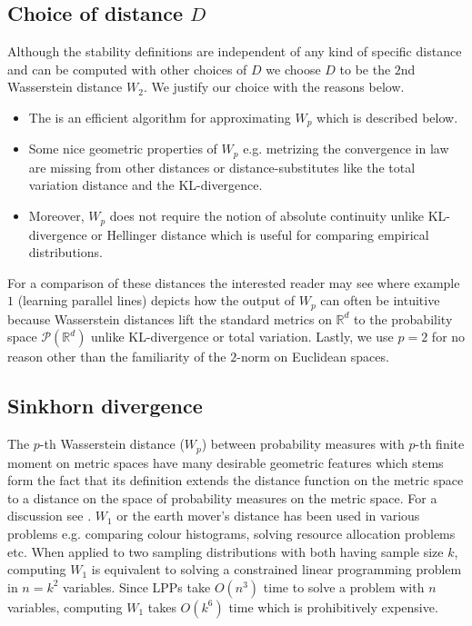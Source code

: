{\color{mypink}\subsection{Choice of distance $D$} Although the stability definitions are independent of  any kind of specific distance and can be computed with other choices of $D$ we choose $D$ to be the $2$nd Wasserstein distance $W_2$. We justify our choice with the reasons below.
\begin{itemize}
    \item The is an efficient algorithm for approximating $W_p$ which is described below. 
    \item Some nice geometric properties of $W_p$ e.g. metrizing the convergence in law \cite{feydy2019interpolating} are missing from other distances or distance-substitutes like the  total variation distance and  the KL-divergence. 
    \item Moreover, $W_p$ does not require the notion of absolute continuity unlike KL-divergence or Hellinger distance which is useful for comparing empirical distributions.
\end{itemize}
For a comparison of these distances the interested reader may see \cite{arjovsky2017wasserstein} where example $1$ (learning parallel lines) depicts how the output of $W_p$ can often be intuitive because Wasserstein distances lift the standard metrics on $\mathbb R^d$ to the probability space $\mathcal P(\mathbb R^d)$ unlike KL-divergence or total variation. Lastly, we use $p=2$ for no reason other than the familiarity of the $2$-norm on Euclidean spaces.}

\subsection{Sinkhorn divergence} \label{ssec-sink--probing-nfs}

The $p$-th Wasserstein distance ($W_p$) between probability measures with $p$-th finite moment on metric spaces have many desirable geometric features which stems form the fact that its definition extends the distance function on the metric space to a distance on the space of probability measures on the metric space. For a discussion see \cite{feydy2019interpolating, arjovsky2017wasserstein}. $W_1$ or the earth mover's distance has been used in various problems e.g. comparing colour histograms, solving resource allocation problems etc. When applied to two sampling distributions with both having sample size $k$, computing $W_1$ is equivalent to solving a constrained linear programming problem in $n = k^2$ variables. Since LPPs take $O(n^3)$ time to solve a problem with $n$ variables, computing $W_1$ takes $O(k^6)$ time which is prohibitively expensive.

